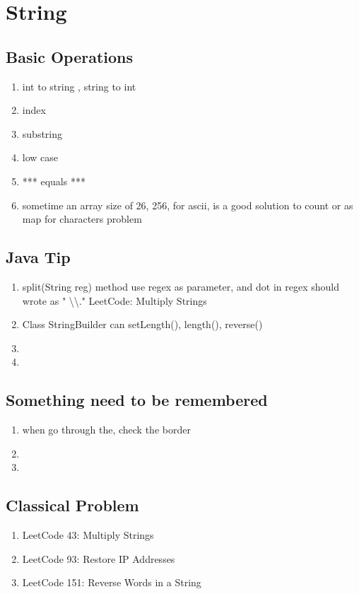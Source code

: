\chapter{ String }

\section{ Basic Operations  }



\begin{enumerate}
    \item int to string , string to int
    \item index
    \item substring
    \item low case
    \item *** equals ***
    \item sometime an array size of 26, 256, for ascii, is a good solution to count or as map for characters problem



\end{enumerate}

\section{ Java Tip }

 \begin{enumerate}
    \item split(String reg) method use regex as parameter, and dot in regex should wrote as " \textbackslash \textbackslash ." LeetCode: Multiply Strings

    \item Class StringBuilder can setLength(), length(), reverse()   

    \item

    \item

\end{enumerate}

\section{ Something need to be remembered }

\begin{enumerate}
    \item  when go through the, check the border 
    \item  
    \item  

\end{enumerate}


\section{ Classical Problem }

\begin{enumerate}
    \item LeetCode 43: Multiply Strings
    \item LeetCode 93: Restore IP Addresses
    \item LeetCode 151: Reverse Words in a String

\end{enumerate}
